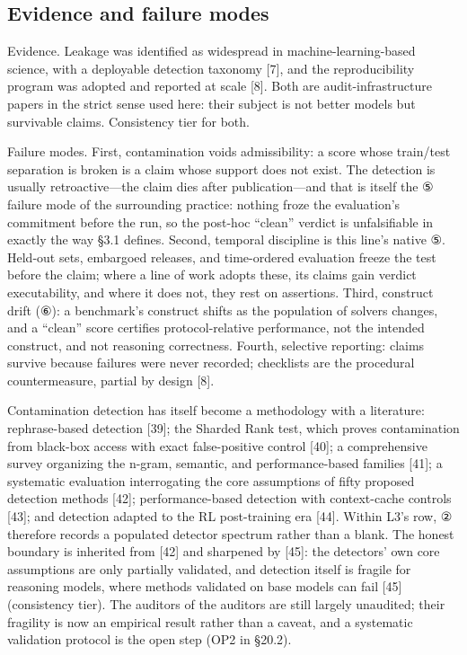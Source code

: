 \documentclass[11pt]{article}
\begin{document}
\subsection{Evidence and failure modes}
\noindent Evidence. Leakage was identified as widespread in machine-learning-based science, with a deployable detection taxonomy [7], and the reproducibility program was adopted and reported at scale [8]. Both are audit-infrastructure papers in the strict sense used here: their subject is not better models but survivable claims. Consistency tier for both.\par
\noindent Failure modes. First, contamination voids admissibility: a score whose train/test separation is broken is a claim whose support does not exist. The detection is usually retroactive—the claim dies after publication—and that is itself the ⑤ failure mode of the surrounding practice: nothing froze the evaluation's commitment before the run, so the post-hoc ``clean'' verdict is unfalsifiable in exactly the way §3.1 defines. Second, temporal discipline is this line's native ⑤. Held-out sets, embargoed releases, and time-ordered evaluation freeze the test before the claim; where a line of work adopts these, its claims gain verdict executability, and where it does not, they rest on assertions. Third, construct drift (⑥): a benchmark's construct shifts as the population of solvers changes, and a ``clean'' score certifies protocol-relative performance, not the intended construct, and not reasoning correctness. Fourth, selective reporting: claims survive because failures were never recorded; checklists are the procedural countermeasure, partial by design [8].\par
\noindent Contamination detection has itself become a methodology with a literature: rephrase-based detection [39]; the Sharded Rank test, which proves contamination from black-box access with exact false-positive control [40]; a comprehensive survey organizing the n-gram, semantic, and performance-based families [41]; a systematic evaluation interrogating the core assumptions of fifty proposed detection methods [42]; performance-based detection with context-cache controls [43]; and detection adapted to the RL post-training era [44]. Within L3's row, ② therefore records a populated detector spectrum rather than a blank. The honest boundary is inherited from [42] and sharpened by [45]: the detectors' own core assumptions are only partially validated, and detection itself is fragile for reasoning models, where methods validated on base models can fail [45] (consistency tier). The auditors of the auditors are still largely unaudited; their fragility is now an empirical result rather than a caveat, and a systematic validation protocol is the open step (OP2 in §20.2).\par
\end{document}
